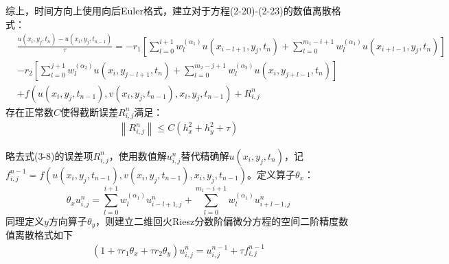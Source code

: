 \documentclass[twoside,UTF8]{nputhesis}
\begin{document}
综上，时间方向上使用向后Euler格式，建立对于方程(2-20)-(2-23)的数值离散格式：
\begin{equation}
\begin{split}
& \frac{u({{x}_{i}},{{y}_{j}},{{t}_{n}})-u({{x}_{i}},{{y}_{j}},{{t}_{n-1}})}{\tau }
=-{{r}_{1}}\left[\sum\limits_{l=0}^{i+1}{w_{l}^{({{\alpha }_{1}})}u({{x}_{i-l+1}},{{y}_{j}},{{t}_{n}})}+
\sum\limits_{l=0}^{{{m}_{1}}-i+1}{w_{l}^{({{\alpha }_{1}})}}u({{x}_{i+l-1}},{{y}_{j}},{{t}_{n}})\right] \\
& -{{r}_{2}}\left[\sum\limits_{l=0}^{j+1}{w_{l}^{({{\alpha }_{2}})}u({{x}_{i}},{{y}_{j-l+1}},{{t}_{n}})}+
\sum\limits_{l=0}^{{{m}_{2}}-j+1}{w_{l}^{({{\alpha }_{2}})}u({{x}_{i}},{{y}_{j+l-1}},{{t}_{n}})}\right]\\
&+f(u({{x}_{i}},{{y}_{j}},{{t}_{n-1}}),v({{x}_{i}},{{y}_{j}},{{t}_{n-1}}),{{x}_{i}},{{y}_{j}},{{t}_{n-1}})+R_{i,j}^{n}
\end{split}
\end{equation}
存在正常数$C$使得截断误差$R_{i,j}^{n}$满足：
\begin{equation}
\begin{split}
\left\| R_{i,j}^{n} \right\|\le C(h_{x}^{2}+h_{y}^{2}+\tau )
\end{split}
\end{equation}

略去式(3-8)的误差项$R_{i,j}^{n}$，使用数值解$u_{i,j}^{n}$替代精确解$u({{x}_{i}},{{y}_{j}},{{t}_{n}})$，记$f_{i,j}^{n-1}=f(u({{x}_{i}},{{y}_{j}},{{t}_{n-1}}),v({{x}_{i}},{{y}_{j}},{{t}_{n-1}}),{{x}_{i}},{{y}_{j}},{{t}_{n-1}})$。定义算子${\theta }_{x}$：
\[{{\theta }_{x}}u_{i,j}^{n}=\sum\limits_{l=0}^{i+1}{w_{l}^{({{\alpha }_{1}})}u_{i-l+1,j}^{n}}+\sum\limits_{l=0}^{{{m}_{1}}-i+1}{w_{l}^{({{\alpha }_{1}})}u_{i+l-1,j}^{n}}\]
同理定义$y$方向算子${{\theta }_{y}}$，则建立二维回火Riesz分数阶偏微分方程的空间二阶精度数值离散格式如下
\begin{equation}
\begin{split}
(1+\tau {{r}_{1}}{{\theta }_{x}}+\tau {{r}_{2}}{{\theta }_{y}})u_{i,j}^{n}=u_{i,j}^{n-1}+\tau f_{i,j}^{n-1}
\end{split}
\end{equation}
\end{document}
